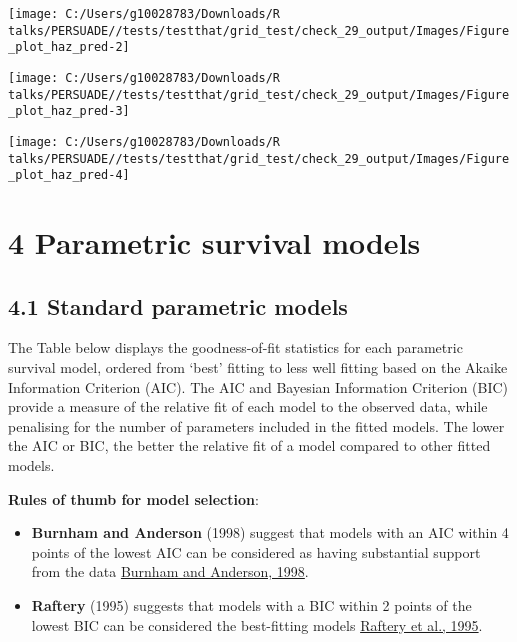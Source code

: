 \documentclass[
]{article}
\providecommand{\tightlist}{%
  \setlength{\itemsep}{0pt}\setlength{\parskip}{0pt}}
\begin{document}
\begin{flushleft}\texttt{[image: C:/Users/g10028783/Downloads/R talks/PERSUADE//tests/testthat/grid\_test/check\_29\_output/Images/Figure\_plot\_haz\_pred-2]} \end{flushleft}

\begin{flushleft}\texttt{[image: C:/Users/g10028783/Downloads/R talks/PERSUADE//tests/testthat/grid\_test/check\_29\_output/Images/Figure\_plot\_haz\_pred-3]} \end{flushleft}

\begin{flushleft}\texttt{[image: C:/Users/g10028783/Downloads/R talks/PERSUADE//tests/testthat/grid\_test/check\_29\_output/Images/Figure\_plot\_haz\_pred-4]} \end{flushleft}

\clearpage

\section{4 Parametric survival models}\label{parametric-survival-models}

\subsection{4.1 Standard parametric
models}\label{standard-parametric-models}

The Table below displays the goodness-of-fit statistics for each
parametric survival model, ordered from `best' fitting to less well
fitting based on the Akaike Information Criterion (AIC). The AIC and
Bayesian Information Criterion (BIC) provide a measure of the relative
fit of each model to the observed data, while penalising for the number
of parameters included in the fitted models. The lower the AIC or BIC,
the better the relative fit of a model compared to other fitted models.

\textbf{Rules of thumb for model selection}:

\begin{itemize}
\tightlist
\item
  \textbf{Burnham and Anderson} (1998) suggest that models with an AIC
  within 4 points of the lowest AIC can be considered as having
  substantial support from the data
  \href{https://doi.org/10.1007/978-1-4757-2917-7}{Burnham and Anderson,
  1998}.\\
\item
  \textbf{Raftery} (1995) suggests that models with a BIC within 2
  points of the lowest BIC can be considered the best-fitting models
  \href{https://doi.org/10.2307/271063}{Raftery et al., 1995}.
\end{itemize}
\end{document}
